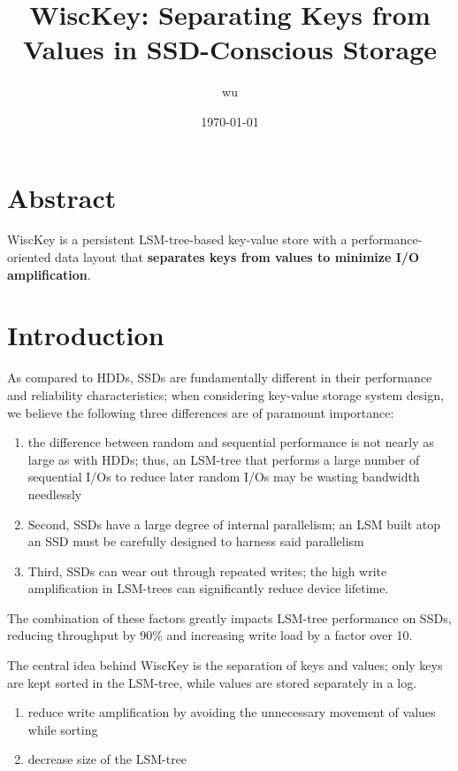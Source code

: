 \documentclass[11pt]{article}
\author{wu}
\date{\today}
\title{WiscKey: Separating Keys from Values in SSD-Conscious Storage}
\begin{document}
\maketitle
\section{Abstract}
\label{sec:org61a1e88}
WiscKey is a persistent LSM-tree-based key-value store with a performance-oriented data layout that
\textbf{separates keys from values to minimize I/O amplification}.
\section{Introduction}
\label{sec:orgfb65a28}
As compared to HDDs, SSDs are fundamentally different in their performance and reliability
characteristics; when considering key-value storage system design, we believe the following three
differences are of paramount importance:
\begin{enumerate}
\item the difference between random and sequential performance is not nearly as large as with HDDs; thus,
an LSM-tree that performs a large number of sequential I/Os to reduce later random I/Os may be
wasting bandwidth needlessly
\item Second, SSDs have a large degree of internal parallelism; an LSM built atop an SSD must be
carefully designed to harness said parallelism
\item Third, SSDs can wear out through repeated writes; the high write ampliﬁcation in LSM-trees can
signiﬁcantly reduce device lifetime.
\end{enumerate}

The combination of these factors greatly impacts LSM-tree performance on SSDs, reducing throughput by
90\% and increasing write load by a factor over 10.

The central idea behind WiscKey is the separation of keys and values; only keys are kept sorted in the
LSM-tree, while values are stored separately in a log.
\begin{enumerate}
\item reduce write amplification by avoiding the unnecessary movement of values while sorting
\item decrease size of the LSM-tree
\end{enumerate}
\end{document}
